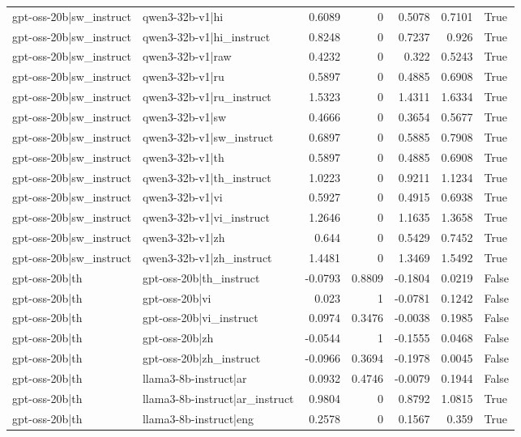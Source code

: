 \begin{table}
\begin{tabular}{l l r r r r l}
gpt-oss-20b|sw_instruct & qwen3-32b-v1|hi & 0.6089 & 0 & 0.5078 & 0.7101 & True \\
gpt-oss-20b|sw_instruct & qwen3-32b-v1|hi_instruct & 0.8248 & 0 & 0.7237 & 0.926 & True \\
gpt-oss-20b|sw_instruct & qwen3-32b-v1|raw & 0.4232 & 0 & 0.322 & 0.5243 & True \\
gpt-oss-20b|sw_instruct & qwen3-32b-v1|ru & 0.5897 & 0 & 0.4885 & 0.6908 & True \\
gpt-oss-20b|sw_instruct & qwen3-32b-v1|ru_instruct & 1.5323 & 0 & 1.4311 & 1.6334 & True \\
gpt-oss-20b|sw_instruct & qwen3-32b-v1|sw & 0.4666 & 0 & 0.3654 & 0.5677 & True \\
gpt-oss-20b|sw_instruct & qwen3-32b-v1|sw_instruct & 0.6897 & 0 & 0.5885 & 0.7908 & True \\
gpt-oss-20b|sw_instruct & qwen3-32b-v1|th & 0.5897 & 0 & 0.4885 & 0.6908 & True \\
gpt-oss-20b|sw_instruct & qwen3-32b-v1|th_instruct & 1.0223 & 0 & 0.9211 & 1.1234 & True \\
gpt-oss-20b|sw_instruct & qwen3-32b-v1|vi & 0.5927 & 0 & 0.4915 & 0.6938 & True \\
gpt-oss-20b|sw_instruct & qwen3-32b-v1|vi_instruct & 1.2646 & 0 & 1.1635 & 1.3658 & True \\
gpt-oss-20b|sw_instruct & qwen3-32b-v1|zh & 0.644 & 0 & 0.5429 & 0.7452 & True \\
gpt-oss-20b|sw_instruct & qwen3-32b-v1|zh_instruct & 1.4481 & 0 & 1.3469 & 1.5492 & True \\
gpt-oss-20b|th & gpt-oss-20b|th_instruct & -0.0793 & 0.8809 & -0.1804 & 0.0219 & False \\
gpt-oss-20b|th & gpt-oss-20b|vi & 0.023 & 1 & -0.0781 & 0.1242 & False \\
gpt-oss-20b|th & gpt-oss-20b|vi_instruct & 0.0974 & 0.3476 & -0.0038 & 0.1985 & False \\
gpt-oss-20b|th & gpt-oss-20b|zh & -0.0544 & 1 & -0.1555 & 0.0468 & False \\
gpt-oss-20b|th & gpt-oss-20b|zh_instruct & -0.0966 & 0.3694 & -0.1978 & 0.0045 & False \\
gpt-oss-20b|th & llama3-8b-instruct|ar & 0.0932 & 0.4746 & -0.0079 & 0.1944 & False \\
gpt-oss-20b|th & llama3-8b-instruct|ar_instruct & 0.9804 & 0 & 0.8792 & 1.0815 & True \\
gpt-oss-20b|th & llama3-8b-instruct|eng & 0.2578 & 0 & 0.1567 & 0.359 & True \\

\end{tabular}
\end{table}

